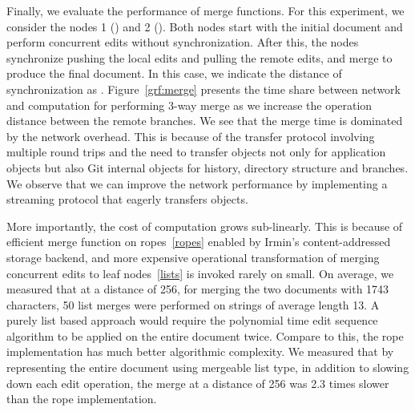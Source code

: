 Finally, we evaluate the performance of merge functions. For this experiment,
we consider the nodes 1 () and 2 (). Both
nodes start with the initial document and perform  concurrent edits
without synchronization. After this, the nodes synchronize pushing the local
edits and pulling the remote edits, and merge to produce the final document. In
this case, we indicate the distance of synchronization as .
Figure~\ref{grf:merge} presents the time share between network and computation
for performing 3-way merge as we increase the operation distance between the
remote branches. We see that the merge time is dominated by the network
overhead. This is because of the transfer protocol involving multiple
round trips and the need to transfer objects not only for application objects
but also Git internal objects for history, directory structure and branches. We
observe that we can improve the network performance by implementing a streaming
protocol that eagerly transfers objects.

More importantly, the cost of computation grows sub-linearly. This is because
of efficient merge function on ropes~\ref{ropes} enabled by Irmin's
content-addressed storage backend, and more expensive operational
transformation of merging concurrent edits to leaf nodes~\ref{lists} is invoked
rarely on small. On average, we measured that at a distance of 256, for merging
the two documents with 1743 characters, 50 list merges were performed on
strings of average length 13. A purely list based approach would require the
polynomial time edit sequence algorithm to be applied on the entire document
twice. Compare to this, the rope implementation has much better algorithmic
complexity. We measured that by representing the entire document using
mergeable list type, in addition to slowing down each edit operation, the merge
at a distance of 256 was 2.3 times slower than the rope implementation.
